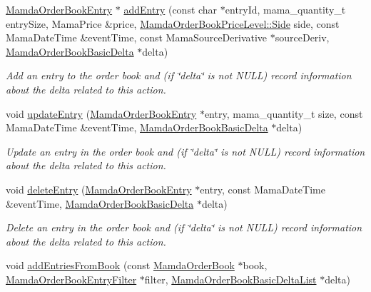 \begin{CompactItemize}
\hyperlink{classWombat_1_1MamdaOrderBookEntry}{Mamda\-Order\-Book\-Entry} $\ast$ \hyperlink{classWombat_1_1MamdaOrderBook_3d6ad8b2327a1211e57417fc1b08c373}{add\-Entry} (const char $\ast$entry\-Id, mama\_\-quantity\_\-t entry\-Size, Mama\-Price \&price, \hyperlink{classWombat_1_1MamdaOrderBookPriceLevel_384c34b0a74d874b8969dee9b0d3718d}{Mamda\-Order\-Book\-Price\-Level::Side} side, const Mama\-Date\-Time \&event\-Time, const Mama\-Source\-Derivative $\ast$source\-Deriv, \hyperlink{classWombat_1_1MamdaOrderBookBasicDelta}{Mamda\-Order\-Book\-Basic\-Delta} $\ast$delta)
\begin{CompactList}\small\item\em Add an entry to the order book and (if \char`\"{}delta\char`\"{} is not NULL) record information about the delta related to this action. \item\end{CompactList}\item 
void \hyperlink{classWombat_1_1MamdaOrderBook_f07133227a07a953db03a055233388a8}{update\-Entry} (\hyperlink{classWombat_1_1MamdaOrderBookEntry}{Mamda\-Order\-Book\-Entry} $\ast$entry, mama\_\-quantity\_\-t size, const Mama\-Date\-Time \&event\-Time, \hyperlink{classWombat_1_1MamdaOrderBookBasicDelta}{Mamda\-Order\-Book\-Basic\-Delta} $\ast$delta)
\begin{CompactList}\small\item\em Update an entry in the order book and (if \char`\"{}delta\char`\"{} is not NULL) record information about the delta related to this action. \item\end{CompactList}\item 
void \hyperlink{classWombat_1_1MamdaOrderBook_027cf7c0439c3952475a678ddbf26f60}{delete\-Entry} (\hyperlink{classWombat_1_1MamdaOrderBookEntry}{Mamda\-Order\-Book\-Entry} $\ast$entry, const Mama\-Date\-Time \&event\-Time, \hyperlink{classWombat_1_1MamdaOrderBookBasicDelta}{Mamda\-Order\-Book\-Basic\-Delta} $\ast$delta)
\begin{CompactList}\small\item\em Delete an entry in the order book and (if \char`\"{}delta\char`\"{} is not NULL) record information about the delta related to this action. \item\end{CompactList}\item 
void \hyperlink{classWombat_1_1MamdaOrderBook_4c008315083016a87016cf2078bd3a83}{add\-Entries\-From\-Book} (const \hyperlink{classWombat_1_1MamdaOrderBook}{Mamda\-Order\-Book} $\ast$book, \hyperlink{classWombat_1_1MamdaOrderBookEntryFilter}{Mamda\-Order\-Book\-Entry\-Filter} $\ast$filter, \hyperlink{classWombat_1_1MamdaOrderBookBasicDeltaList}{Mamda\-Order\-Book\-Basic\-Delta\-List} $\ast$delta)

\end{CompactItemize}
